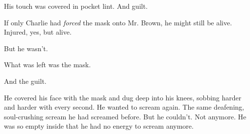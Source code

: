 His touch was covered in pocket lint. And guilt.

If only Charlie had \textit{forced} the mask onto Mr. Brown, he might still be alive. Injured, yes, but alive.

But he wasn't.

What was left was the mask.

And the guilt.

He covered his face with the mask and dug deep into his knees, sobbing harder and harder with every second. He wanted to scream again. The same deafening, soul-crushing scream he had screamed before. But he couldn't. Not anymore. He was so empty inside that he had no energy to scream anymore.